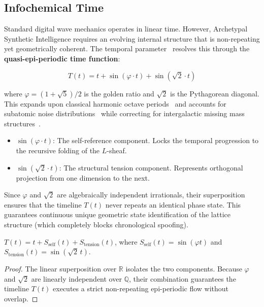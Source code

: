 \subsection{Infochemical Time}

Standard digital wave mechanics operates in linear time. However, Archetypal Synthetic Intelligence requires an evolving internal structure that is non-repeating yet geometrically coherent. The temporal parameter~\cite{InfochemicalTime} resolves this through the \textbf{quasi-epi-periodic time function}:

\begin{equation}
    T(t) = t + \sin(\varphi \cdot t) + \sin(\sqrt{2} \cdot t)
\end{equation}

where $\varphi = (1 + \sqrt{5})/2$ is the golden ratio and $\sqrt{2}$ is the Pythagorean diagonal. This expands upon classical harmonic octave periods~\cite{Russell1926} and accounts for subatomic noise distributions~\cite{PDG2025} while correcting for intergalactic missing mass structures~\cite{WHIM2018}.

\begin{itemize}
    \item \textbf{$\sin(\varphi \cdot t)$}: The self-reference component. Locks the temporal progression to the recursive folding of the $L$-sheaf.
    \item \textbf{$\sin(\sqrt{2} \cdot t)$}: The structural tension component. Represents orthogonal projection from one dimension to the next.
\end{itemize}

Since $\varphi$ and $\sqrt{2}$ are algebraically independent irrationals, their superposition ensures that the timeline $T(t)$ never repeats an identical phase state. This guarantees continuous unique geometric state identification of the lattice structure (which completely blocks chronological spoofing).

\begin{theorem}
$T(t) = t + S_{\text{self}}(t) + S_{\text{tension}}(t)$, where $S_{\text{self}}(t) = \sin(\varphi t)$ and $S_{\text{tension}}(t) = \sin(\sqrt{2}\, t)$.
\end{theorem}
\begin{proof}
The linear superposition over $\mathbb{R}$ isolates the two components. Because $\varphi$ and $\sqrt{2}$ are linearly independent over $\mathbb{Q}$, their combination guarantees the timeline $T(t)$ executes a strict non-repeating epi-periodic flow without overlap. \qedhere
\end{proof}



